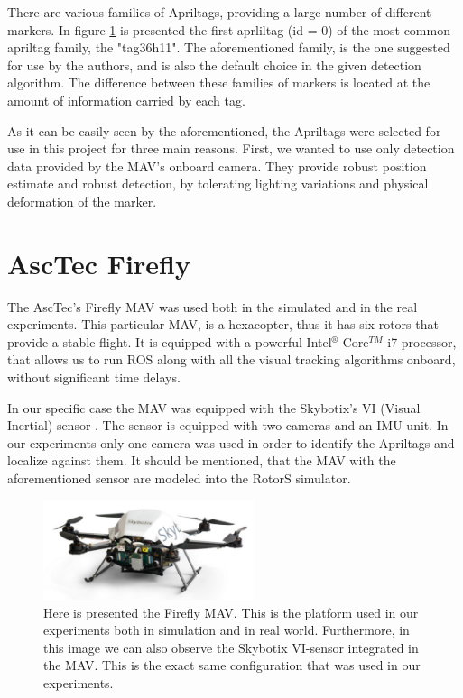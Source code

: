 There are various families of Apriltags, providing a large number of different markers. In figure \ref{pics:tag36h11} is presented the first aprliltag (id = 0) of the most common apriltag family, the "tag36h11". The aforementioned family, is the one suggested for use by the authors, and is also the default choice in the given detection algorithm. The difference between these families of markers is located at the amount of information carried by each tag.

As it can be easily seen by the aforementioned, the Apriltags were selected for use in this project for three main reasons. First, we wanted to use only detection data provided by the MAV's onboard camera. They provide robust position estimate and robust detection, by tolerating lighting variations and physical deformation of the marker. 


\section{AscTec Firefly}
\label{sec:ascTecFirefly}

The AscTec's Firefly MAV was used both in the simulated and in the real experiments. This particular MAV, is a hexacopter, thus it has six rotors that provide a stable flight. It is equipped with a powerful Intel$^{\circledR}$ Core$^{TM}$ i7 processor, that allows us to run ROS along with all the visual tracking algorithms onboard, without significant time delays.

In our specific case the MAV was equipped with the Skybotix's VI (Visual Inertial) sensor \cite{Nklc2014}. The sensor is equipped with two cameras and an IMU unit. In our experiments only one camera was used in order to identify the Apriltags and localize against them. It should be mentioned, that the MAV with the aforementioned sensor are modeled into the RotorS simulator.

\begin{figure}
   \centering
   \includegraphics[width=0.55\textwidth]{images/firefly_vi_big.pdf}
   \caption{Here is presented the Firefly MAV\protect\footnotemark. This is the platform used in our experiments both in simulation and in real world. Furthermore, in this image we can also observe the Skybotix VI-sensor integrated in the MAV. This is the exact same configuration that was used in our experiments.}
   \label{pics:tag36h11}
\end{figure}
 

